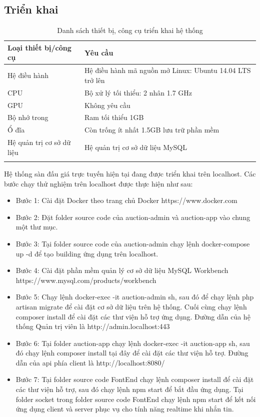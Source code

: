\documentclass{article}
\begin{document}
\subsection{Triển khai}
    \begin{longtable}{| p{}|p{}|} 
    \hline
        \bfseries Loại thiết bị/công cụ & \bfseries Yêu cầu\\\hline
        Hệ điều hành& Hệ điều hành mã nguồn mở Linux: Ubuntu 14.04 LTS trở lên\\\hline
        CPU& Bộ xử lý tối thiểu: 2 nhân 1.7 GHz\\\hline
        GPU& Không yêu cầu\\\hline
        Bộ nhớ trong& Ram tối thiểu 1GB \\\hline
        Ổ đĩa& Còn trống ít nhất 1.5GB lưu trữ phần mềm \\\hline
        Hệ quản trị cơ sở dữ liệu&Hệ quản trị cơ sở dữ liệu MySQL \\\hline
    \caption{Danh sách thiết bị, công cụ triển khai hệ thống}
    \label{bang416}
    \end{longtable}
Hệ thống sàn đấu giá trực tuyến hiện tại đang được triển khai trên localhost. Các bước chạy thử nghiệm trên localhost được thực hiện như sau: 
\begin{itemize}
    \item Bước 1: Cài đặt Docker theo trang chủ Docker https://www.docker.com
    \item Bước 2: Đặt folder source code của auction-admin và auction-app vào chung một thư mục. 
    \item Bước 3: Tại folder source code của auction-admin chạy lệnh docker-compose up -d để tạo building ứng dụng trên localhost.
    \item Bước 4: Cài đặt phần mềm quản lý cơ sở dữ liệu MySQL Workbench https://www.mysql.com/products/workbench
    \item Bước 5: Chạy lệnh docker-exec -it auction-admin sh, sau đó để chạy lệnh php artisan migrate để cài đặt cơ sở dữ liệu trên hệ thống. Cuối cùng chạy lệnh composer install để cài đặt các thư viện hỗ trợ ứng dụng. Đường dẫn của hệ thống Quản trị viên là http://admin.localhost:443
    \item Bước 6: Tại folder auction-app chạy lệnh docker-exec -it auction-app sh, sau đó chạy lệnh composer install tại đây để cài đặt các thư viện hỗ trợ. Đường dẫn của api phía client là http://localhost:8080/
    \item Bước 7: Tại folder source code FontEnd chạy lệnh composer install để cài đặt các thư viện hỗ trợ, sau đó chạy lệnh npm start để bắt đầu ứng dụng. Tại folder socket trong folder source code FontEnd chạy lệnh npm start để kết nối ứng dụng client và server phục vụ cho tính năng realtime khi nhắn tin.
\end{itemize}
\newpage
\end{document}
